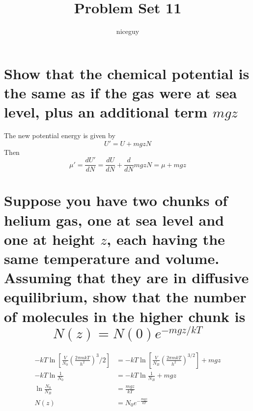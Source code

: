 \documentclass[answers]{exam}
\author{niceguy}
\title{Problem Set 11}
\begin{document}
\maketitle

\begin{questions}


\begin{parts}
    \part{Show that the chemical potential is the same as if the gas were at sea level, plus an additional term $mgz$}

    \begin{solution}
        The new potential energy is given by
        $$U' = U + mgzN$$
        Then
        $$\mu' = \frac{dU'}{dN} = \frac{dU}{dN} + \frac{d}{dN} mgzN = \mu + mgz$$
    \end{solution}

    \part{Suppose you have two chunks of helium gas, one at sea level and one at height $z$, each having the same temperature and volume. Assuming that they are in diffusive equilibrium, show that the number of molecules in the higher chunk is
    $$N(z) = N(0)e^{-mgz/kT}$$
}

    \begin{solution}
        \begin{align*}
            -kT\ln[\frac{V}{N_0}\left(\frac{2\pi mkT}{h^2}\right)^3/2] &= -kT\ln[\frac{V}{N_B}\left(\frac{2\pi mkT}{h^2}\right)^{3/2}] + mgz \\
            -kT\ln\frac{1}{N_0} &= -kT\ln\frac{1}{N_B} + mgz \\
            \ln\frac{N_0}{N_B} &= \frac{mgz}{kT} \\
            N(z) &= N_0 e^{-\frac{mgz}{kT}}
        \end{align*}
    \end{solution}
\end{parts}
\end{questions}
\end{document}
